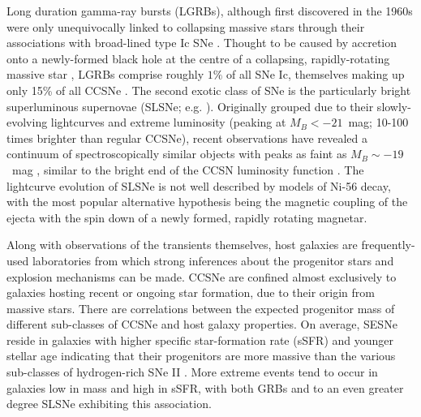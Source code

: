 \documentclass[fleqn,usenatbib,]{mnras}
\begin{document}
 Long duration gamma-ray bursts (LGRBs), although first discovered in the 1960s \citep{Klebesadel1973} were only unequivocally linked to collapsing massive stars through their associations with broad-lined type Ic SNe \citep{Galama1998,Hjorth2003}. Thought to be caused by accretion onto a newly-formed black hole at the centre of a collapsing, rapidly-rotating massive star \citep[e.g.][]{Woosley1993,Woosley2006a,Woosley2006b}, LGRBs comprise roughly $1\%$ of all SNe Ic, themselves making up only 15\% of all CCSNe \citep{Kelly2012,Graham2016}. The second exotic class of SNe is the particularly bright superluminous supernovae (SLSNe; e.g. \citealt{Quimby2011, Gal-Yam2012}). Originally grouped due to their slowly-evolving lightcurves and extreme luminosity (peaking at $M_B < -21$~mag; 10-100 times brighter than regular CCSNe), recent observations have revealed a continuum of spectroscopically similar objects with peaks as faint as $M_B \sim -19$~mag \citep{DeCia2018,Lunnan2018,Angus2019}, similar to the bright end of the CCSN luminosity function \citet{Li2011,Grayling2020}. The lightcurve evolution of SLSNe is not well described by models of Ni-56 decay, with the most popular alternative hypothesis being the magnetic coupling of the ejecta with the spin down of a newly formed, rapidly rotating magnetar.
 
 Along with observations of the transients themselves, host galaxies are frequently-used laboratories from which strong inferences about the progenitor stars and explosion mechanisms can be made. CCSNe are confined almost exclusively to galaxies hosting recent or ongoing star formation, due to their origin from massive stars. There are correlations between the expected progenitor mass of different sub-classes of CCSNe and host galaxy properties. On average, SESNe reside in galaxies with higher specific star-formation rate (sSFR) and younger stellar age indicating that their progenitors are more massive than the various sub-classes of hydrogen-rich SNe II \citep{James2006,Kelly2008,Galbany2018}. More extreme events tend to occur in galaxies low in mass and high in sSFR, with both GRBs \citep[e.g.][]{Fruchter2006,LeFloch2006,Levesque2010,Kruehler2015,Vergani2015,Perley2016b,Palmerio2019,Taggart2019} and to an even greater degree SLSNe \citep[e.g.][]{Neill2011,Lunnan2014,Leloudas2015,Angus2016,Schulze2018,Taggart2019} exhibiting this association.
 
\end{document}

